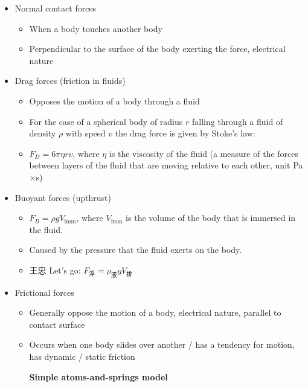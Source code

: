 \begin{itemize}
\begin{itemize}
\begin{itemize}
        \end{itemize}
  \end{itemize}
  \item Normal contact forces
  \begin{itemize}
    \item When a body touches another body
    \item Perpendicular to the surface of the body exerting the force, electrical nature
  \end{itemize}
  \item Drag forces (friction in fluids)
	\begin{itemize}
    \item Opposes the motion of a body through a fluid
    \item For the case of a spherical body of radius $r$ falling through a fluid of density $\rho$ with speed $v$ the drag force is given by Stoke's law:
    \item $F_D=6\pi\eta rv$, where $\eta$ is the viscosity of the fluid (a measure of the forces between layers of the fluid that are moving relative to each other, unit Pa$\times$s)
  \end{itemize}
  \item Buoyant forces (upthrust)
  \begin{itemize}
    \item $F_B=\rho g V_{\text{imm}}$, where $V_\text{imm}$ is the volume of the body that is immersed in the fluid.
    \item Caused by the pressure that the fluid exerts on the body.
    \item 王忠 Let's go: $F_\text{浮}=\rho_\text{液}gV_\text{排}$
  \end{itemize}
  \item Frictional forces
  \begin{itemize}
    \item Generally oppose the motion of a body, electrical nature, parallel to contact surface
    \item Occurs when one body slides over another / has a tendency for motion, has dynamic / static friction
    \begin{center}
	    {\bfseries\small Simple atoms-and-springs model}

\end{center}
\end{itemize}
\end{itemize}
